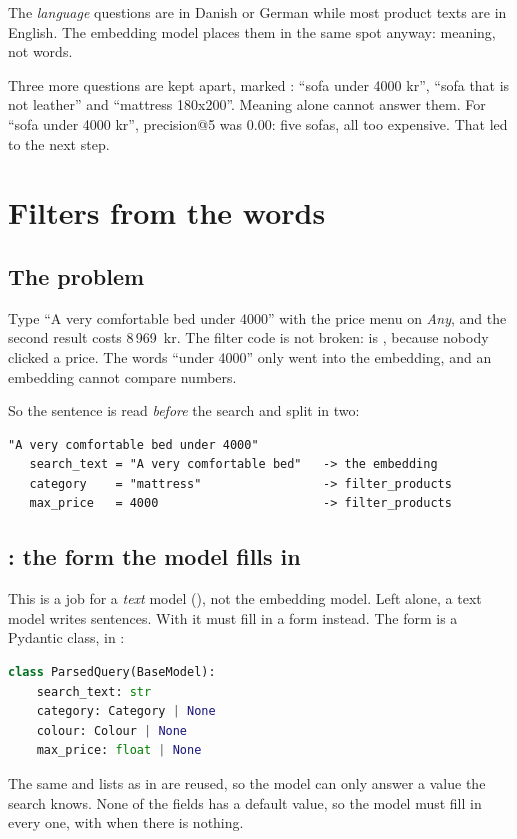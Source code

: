 \documentclass[11pt]{article}
\begin{document}
The \emph{language} questions are in Danish or German while most
product texts are in English. The embedding model places them in the
same spot anyway: meaning, not words.

Three more questions are kept apart, marked :
``sofa under 4000 kr'', ``sofa that is not leather'' and ``mattress
180x200''. Meaning alone cannot answer them. For ``sofa under 4000
kr'', precision@5 was \textcolor{accent}{0.00}: five sofas, all too
expensive. That led to the next step.

\section{Filters from the words}
\label{sec:words}

\subsection{The problem}

Type ``A very comfortable bed under 4000'' with the price menu on
\emph{Any}, and the second result costs 8\,969~kr. The filter code is
not broken:  is , because nobody
clicked a price. The words ``under 4000'' only went into the embedding,
and an embedding cannot compare numbers.

So the sentence is read \emph{before} the search and split in two:
\begin{lstlisting}
"A very comfortable bed under 4000"
   search_text = "A very comfortable bed"   -> the embedding
   category    = "mattress"                 -> filter_products
   max_price   = 4000                       -> filter_products
\end{lstlisting}

\subsection{: the form the model fills in}

This is a job for a \emph{text} model (),
not the embedding model. Left alone, a text model writes sentences.
With  it must fill in a form instead.
The form is a Pydantic class, in :
\begin{lstlisting}[language=Python]
class ParsedQuery(BaseModel):
    search_text: str
    category: Category | None
    colour: Colour | None
    max_price: float | None
\end{lstlisting}
The same  and  lists as in
 are reused, so the model can only answer a value
the search knows. None of the fields has a default value, so the model
must fill in every one, with  when there is nothing.
\end{document}
